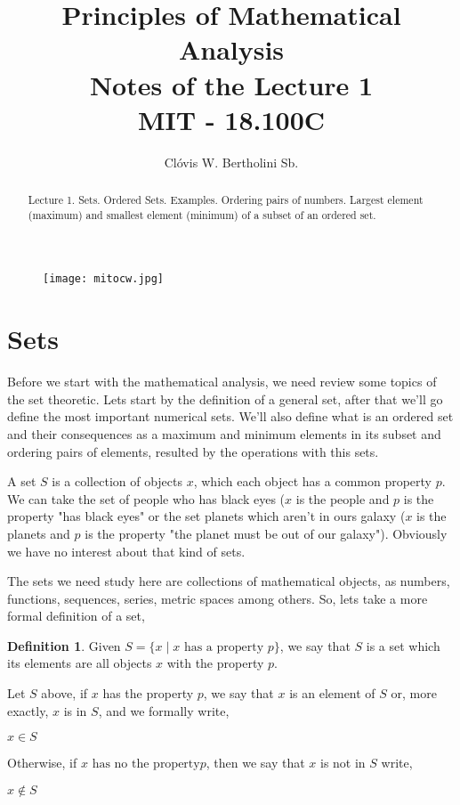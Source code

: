 \documentclass[11pt, a4paper]{amsart}
\title{Principles of Mathematical Analysis\\Notes of the Lecture 1\\MIT - 18.100C}
\author{Clóvis W. Bertholini Sb.}
\numberwithin{equation}{section}
\theoremstyle{plain} %
\theoremstyle{definition}
\newtheorem{defn}{Definition}[section]
\theoremstyle{remark}
\begin{document}
\begin{figure}[h]
\texttt{[image: mitocw.jpg]}
\end{figure}

\maketitle

\begin{abstract}
Lecture 1. Sets. Ordered Sets. Examples. Ordering pairs of numbers. Largest element (maximum) and smallest element (minimum) of a subset of an ordered set.
\end{abstract}

\section{Sets}
Before we start with the mathematical analysis, we need review some topics of the set theoretic. Lets start by the definition of a general set, after that we'll go define the most important numerical sets. We'll also define what is an ordered set and their consequences as a maximum and minimum elements in its subset and ordering pairs of elements, resulted by the operations with this sets.

A set $S$ is a collection of objects $x$, which each object has a common property $p$. 
We can take the set of people who has black eyes ($x$ is the people and $p$ is the property "has black eyes" or the set planets which aren't in ours galaxy ($x$ is the planets and $p$ is the property "the planet must be out of our galaxy"). Obviously we have no interest about that kind of sets.

The sets we need study here are collections of mathematical objects, as numbers, functions, sequences, series, metric spaces among others. So, lets take a more formal definition of a set,

\begin{defn}
    Given $S=\lbrace x\mid x \text{ has a property } p\rbrace$, we say that $S$ is a set which its elements are all objects $x$ with the property $p$.
\end{defn}

Let $S$ above, if $x$ has the property $p$, we say that $x$ is an element of $S$ or, more exactly, $x$ is in $S$, and we formally write,
\begin{center}
    $x\in S$
\end{center}

Otherwise, if $x \text{ has no the property} p$, then we say that $x$ is not in $S$ write,
\begin{center}
    $x\notin S$
\end{center}
\end{document}
